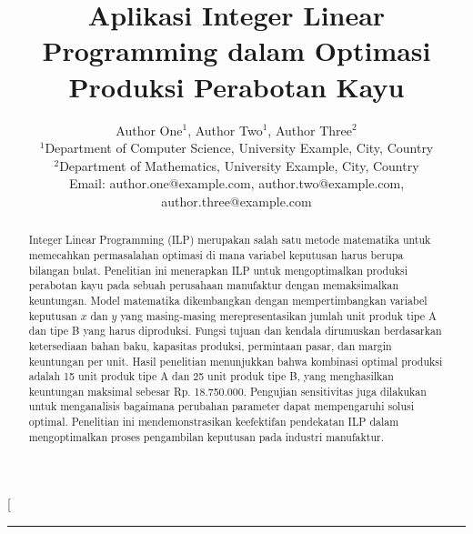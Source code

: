 \documentclass[twocolumn]{article}
\begin{document}
\title{Aplikasi Integer Linear Programming dalam Optimasi Produksi Perabotan Kayu}

\author{
  Author One$^{1}$, Author Two$^{1}$, Author Three$^{2}$ \\
  \footnotesize{$^{1}$Department of Computer Science, University Example, City, Country} \\
  \footnotesize{$^{2}$Department of Mathematics, University Example, City, Country} \\
  \footnotesize{Email: author.one@example.com, author.two@example.com, author.three@example.com}
}

\date{}

\twocolumn[
  \begin{@twocolumnfalse}
    \maketitle
    \begin{abstract}
      Integer Linear Programming (ILP) merupakan salah satu metode matematika untuk memecahkan permasalahan optimasi di mana variabel keputusan harus berupa bilangan bulat. Penelitian ini menerapkan ILP untuk mengoptimalkan produksi perabotan kayu pada sebuah perusahaan manufaktur dengan memaksimalkan keuntungan. Model matematika dikembangkan dengan mempertimbangkan variabel keputusan $x$ dan $y$ yang masing-masing merepresentasikan jumlah unit produk tipe A dan tipe B yang harus diproduksi. Fungsi tujuan dan kendala dirumuskan berdasarkan ketersediaan bahan baku, kapasitas produksi, permintaan pasar, dan margin keuntungan per unit. Hasil penelitian menunjukkan bahwa kombinasi optimal produksi adalah 15 unit produk tipe A dan 25 unit produk tipe B, yang menghasilkan keuntungan maksimal sebesar Rp. 18.750.000. Pengujian sensitivitas juga dilakukan untuk menganalisis bagaimana perubahan parameter dapat mempengaruhi solusi optimal. Penelitian ini mendemonstrasikan keefektifan pendekatan ILP dalam mengoptimalkan proses pengambilan keputusan pada industri manufaktur.
    \end{abstract}
    \vspace{1em}
    
    \noindent\rule{\textwidth}{0.4pt}
    
    \vspace{1em}
    

\end{@twocolumnfalse}
\end{document}
